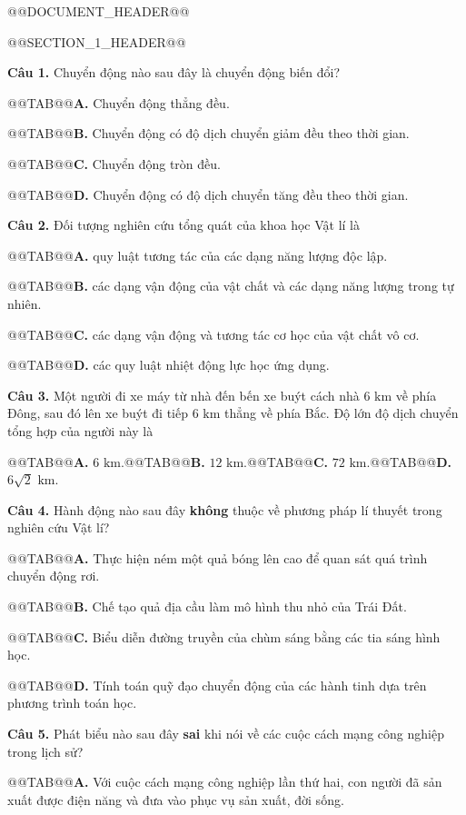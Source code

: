 \documentclass{article}
\begin{document}
@@DOCUMENT_HEADER@@

@@SECTION_1_HEADER@@

\textbf{Câu 1.} Chuyển động nào sau đây là chuyển động biến đổi?

@@TAB@@\textbf{A.} Chuyển động thẳng đều.

@@TAB@@\textbf{B.} Chuyển động có độ dịch chuyển giảm đều theo thời gian.

@@TAB@@\textbf{C.} Chuyển động tròn đều.

@@TAB@@\textbf{D.} Chuyển động có độ dịch chuyển tăng đều theo thời gian.

\textbf{Câu 2.} Đối tượng nghiên cứu tổng quát của khoa học Vật lí là

@@TAB@@\textbf{A.} quy luật tương tác của các dạng năng lượng độc lập.

@@TAB@@\textbf{B.} các dạng vận động của vật chất và các dạng năng lượng trong tự nhiên.

@@TAB@@\textbf{C.} các dạng vận động và tương tác cơ học của vật chất vô cơ.

@@TAB@@\textbf{D.} các quy luật nhiệt động lực học ứng dụng.

\textbf{Câu 3.} Một người đi xe máy từ nhà đến bến xe buýt cách nhà $6\text{ km}$ về phía Đông, sau đó lên xe buýt đi tiếp $6\text{ km}$ thẳng về phía Bắc. Độ lớn độ dịch chuyển tổng hợp của người này là

@@TAB@@\textbf{A.} $6\text{ km}$.@@TAB@@\textbf{B.} $12\text{ km}$.@@TAB@@\textbf{C.} $72\text{ km}$.@@TAB@@\textbf{D.} $6\sqrt{2}\text{ km}$.

\textbf{Câu 4.} Hành động nào sau đây \textbf{không} thuộc về phương pháp lí thuyết trong nghiên cứu Vật lí?

@@TAB@@\textbf{A.} Thực hiện ném một quả bóng lên cao để quan sát quá trình chuyển động rơi.

@@TAB@@\textbf{B.} Chế tạo quả địa cầu làm mô hình thu nhỏ của Trái Đất.

@@TAB@@\textbf{C.} Biểu diễn đường truyền của chùm sáng bằng các tia sáng hình học.

@@TAB@@\textbf{D.} Tính toán quỹ đạo chuyển động của các hành tinh dựa trên phương trình toán học.

\textbf{Câu 5.} Phát biểu nào sau đây \textbf{sai} khi nói về các cuộc cách mạng công nghiệp trong lịch sử?

@@TAB@@\textbf{A.} Với cuộc cách mạng công nghiệp lần thứ hai, con người đã sản xuất được điện năng và đưa vào phục vụ sản xuất, đời sống.
\end{document}
